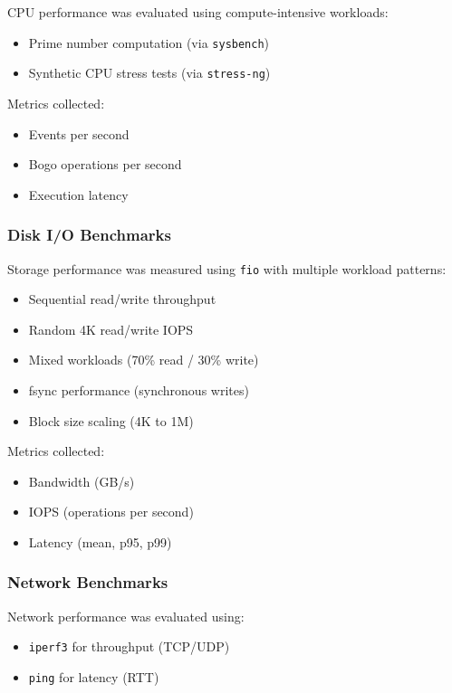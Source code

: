 \documentclass[conference]{IEEEtran}
\begin{document}
CPU performance was evaluated using compute-intensive workloads:

\begin{itemize}
    \item Prime number computation (via \texttt{sysbench})
    \item Synthetic CPU stress tests (via \texttt{stress-ng})
\end{itemize}

Metrics collected:
\begin{itemize}
    \item Events per second
    \item Bogo operations per second
    \item Execution latency
\end{itemize}

\subsubsection{Disk I/O Benchmarks}

Storage performance was measured using \texttt{fio} with multiple workload patterns:

\begin{itemize}
    \item Sequential read/write throughput
    \item Random 4K read/write IOPS
    \item Mixed workloads (70\% read / 30\% write)
    \item fsync performance (synchronous writes)
    \item Block size scaling (4K to 1M)
\end{itemize}

Metrics collected:
\begin{itemize}
    \item Bandwidth (GB/s)
    \item IOPS (operations per second)
    \item Latency (mean, p95, p99)
\end{itemize}

\subsubsection{Network Benchmarks}

Network performance was evaluated using:

\begin{itemize}
    \item \texttt{iperf3} for throughput (TCP/UDP)
    \item \texttt{ping} for latency (RTT)
\end{itemize}
\end{document}
